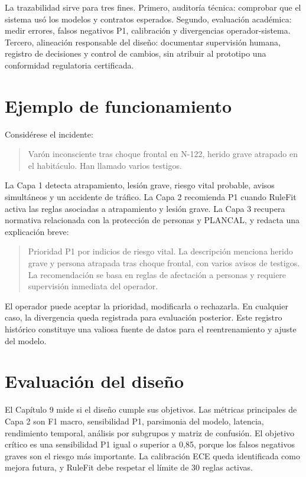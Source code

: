 La trazabilidad sirve para tres fines. Primero, auditoría técnica: comprobar que el sistema usó los modelos y contratos esperados. Segundo, evaluación académica: medir errores, falsos negativos P1, calibración y divergencias operador-sistema. Tercero, alineación responsable del diseño: documentar supervisión humana, registro de decisiones y control de cambios, sin atribuir al prototipo una conformidad regulatoria certificada.

\section{Ejemplo de funcionamiento}

Considérese el incidente:

\begin{quote}
Varón inconsciente tras choque frontal en N-122, herido grave atrapado en el habitáculo. Han llamado varios testigos.
\end{quote}

La Capa 1 detecta atrapamiento, lesión grave, riesgo vital probable, avisos simultáneos y un accidente de tráfico. La Capa 2 recomienda P1 cuando RuleFit activa las reglas asociadas a atrapamiento y lesión grave. La Capa 3 recupera normativa relacionada con la protección de personas y PLANCAL, y redacta una explicación breve:

\begin{quote}
Prioridad P1 por indicios de riesgo vital. La descripción menciona herido grave y persona atrapada tras choque frontal, con varios avisos de testigos. La recomendación se basa en reglas de afectación a personas y requiere supervisión inmediata del operador.
\end{quote}

El operador puede aceptar la prioridad, modificarla o rechazarla. En cualquier caso, la divergencia queda registrada para evaluación posterior. Este registro histórico constituye una valiosa fuente de datos para el reentrenamiento y ajuste del modelo.

\section{Evaluación del diseño}

El Capítulo 9 mide si el diseño cumple sus objetivos. Las métricas principales de Capa 2 son F1 macro, sensibilidad P1, parsimonia del modelo, latencia, rendimiento temporal, análisis por subgrupos y matriz de confusión. El objetivo crítico es una sensibilidad P1 igual o superior a 0,85, porque los falsos negativos graves son el riesgo más importante. La calibración ECE queda identificada como mejora futura, y RuleFit debe respetar el límite de 30 reglas activas.

